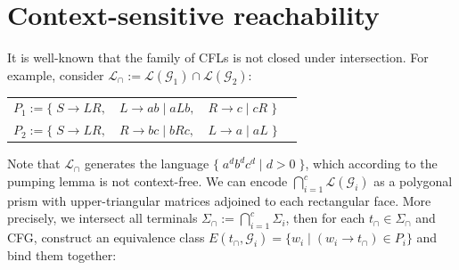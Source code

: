 \documentclass[sigplan,review,anonymous,acmsmall]{acmart}\settopmatter{printfolios=false,printccs=false,printacmref=false}
\begin{document}
\section{Context-sensitive reachability}

It is well-known that the family of CFLs is not closed under intersection. For example, consider $\mathcal{L}_\cap := \mathcal{L}(\mathcal{G}_1) \cap \mathcal{L}(\mathcal{G}_2)$:

\begin{table}[H]
\begin{tabular}{llll}
  $P_1 := \big\{\;S \rightarrow L R,$ & $L \rightarrow a b \mid a L b,$ & $R \rightarrow c \mid c R\;\big\}$\vspace{5pt}\\
  $P_2 := \big\{\;S \rightarrow L R,$ & $R \rightarrow b c \mid b R c,$ & $L \rightarrow a \mid a L\;\big\}$
\end{tabular}
\end{table}

\noindent Note that $\mathcal{L}_\cap$ generates the language $\big\{\;a^d b^d c^d \mid d > 0\;\big\}$, which according to the pumping lemma is not context-free. We can encode $\bigcap_{i=1}^c \mathcal{L}(\mathcal{G}_i)$ as a polygonal prism with upper-triangular matrices adjoined to each rectangular face. More precisely, we intersect all terminals $\Sigma_\cap := \bigcap_{i=1}^c \Sigma_i$, then for each $t_\cap \in \Sigma_\cap$ and CFG, construct an equivalence class $E(t_\cap, \mathcal{G}_i) = \{ w_i \mid (w_i \rightarrow t_\cap) \in P_i\}$ and bind them together:\vspace{-5pt}
\end{document}
